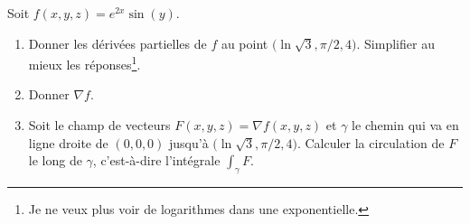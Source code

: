 
\begin{exercice}\label{exoreserve0007}

    Soit \( f(x,y,z)= e^{2x}\sin(y)\).
    \begin{enumerate}
        \item
            Donner les dérivées partielles de \( f\) au point \( \big( \ln\sqrt{3},\pi/2,4 \big)\). Simplifier au mieux les réponses\footnote{Je ne veux plus voir de logarithmes dans une exponentielle.}.
        \item
            Donner \( \nabla f\).
        \item
            Soit le champ de vecteurs \( F(x,y,z)=\nabla f(x,y,z)\) et \( \gamma\) le chemin qui va en ligne droite de \( (0,0,0)\) jusqu'à \( \big( \ln\sqrt{3},\pi/2,4 \big)\). Calculer la circulation de \( F\) le long de \( \gamma\), c'est-à-dire l'intégrale \( \int_{\gamma}F\).

    \end{enumerate}

\end{exercice}
